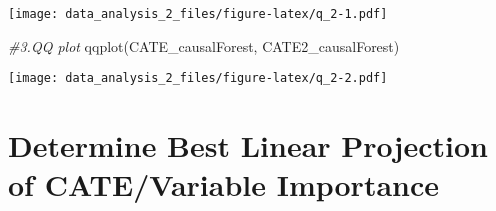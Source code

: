 \documentclass[
]{article}
\newenvironment{Shaded}{\begin{snugshade}}{\end{snugshade}}
\newcommand{\CommentTok}[1]{\textcolor[rgb]{0.56,0.35,0.01}{\textit{#1}}}
\newcommand{\FunctionTok}[1]{\textcolor[rgb]{0.00,0.00,0.00}{#1}}
\newcommand{\NormalTok}[1]{#1}
\begin{document}
\texttt{[image: data\_analysis\_2\_files/figure-latex/q\_2-1.pdf]}

\begin{Shaded}
\begin{Highlighting}[]
\CommentTok{\#3.QQ plot}
\FunctionTok{qqplot}\NormalTok{(CATE\_causalForest, CATE2\_causalForest)}
\end{Highlighting}
\end{Shaded}

\texttt{[image: data\_analysis\_2\_files/figure-latex/q\_2-2.pdf]}

\hypertarget{determine-best-linear-projection-of-catevariable-importance}{%
\section{Determine Best Linear Projection of CATE/Variable
Importance}\label{determine-best-linear-projection-of-catevariable-importance}}
\end{document}
